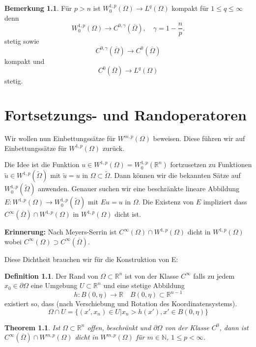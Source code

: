 \documentclass[
paper=a4,
bibtotocnumbered,
liststotocnumbered,
tablecaptionabove,
pointlessnumbers,
twoside,
openright,
10pt
]
{report}
\newtheorem{thm}{Theorem}[chapter]
\theoremstyle{definition}
\newtheorem*{df}{Definition}
\newtheorem*{rem}{Bemerkung}
\numberwithin{equation}{chapter}
\begin{document}
\begin{rem}
 Für $p>n$ ist $W_0^{1,p}(\Omega) \to L^q(\Omega)$ kompakt für $1\le q \le\infty$ denn 
 \begin{equation}
  W_0^{1,p}(\Omega) \to C^{0,\gamma}(\overline{\Omega}), \quad \gamma = 1-\frac{n}{p}.
 \end{equation}
 stetig sowie 
 \begin{equation}
  C^{0,\gamma}(\overline{\Omega}) \to C^0(\overline{\Omega})
 \end{equation}
kompakt und
 \begin{equation}
  C^0(\overline{\Omega}) \to L^q(\Omega)
 \end{equation}
 stetig.
 
 \chapter{Fortsetzungs- und Randoperatoren}

 Wir wollen nun Einbettungssätze für $W^{m,p}(\Omega)$ beweisen. Diese führen wir auf Einbettungssätze für $W^{1,p}(\Omega)$ zurück.  

 Die Idee ist die Funktion $u\in W^{1,p}(\Omega)=W_0^{1,p}(\mathbb R^n)$ fortzusetzen zu Funktionen $\tilde u \in W^{1,p}(\tilde \Omega)$ mit $\tilde u = u$ in $\Omega\subset \tilde \Omega$.   Dann können wir die bekannten Sätze auf $W_0^{1,p}(\tilde \Omega)$ anwenden.   Genauer suchen wir eine beschränkte lineare Abbildung $E: W^{1,p}(\Omega)\to W_0^{1,p}(\tilde \Omega)$ mit $Eu=u$ in $\Omega$.  Die Existenz von $E$ impliziert dass $C^\infty(\overline{\Omega}) \cap W^{1,p}(\Omega)$ in $W^{1,p}(\Omega)$ dicht ist.
 
 \textbf{Erinnerung:} Nach Meyers-Serrin ist $C^\infty(\Omega) \cap W^{1,p}(\Omega)$ dicht in $W^{1,p}(\Omega)$ wobei $C^\infty(\Omega) \supset C^\infty(\overline{\Omega})$.

Diese Dichtheit brauchen wir für die Konstruktion von E:
\end{rem}

\begin{df}
 Der Rand von $\Omega\subset \mathbb R^n$ ist von der Klasse $C^\infty$ falls zu jedem $x_0 \in \partial \Omega$ eine Umgebung $U\subset \mathbb R^n$ und eine stetige Abbildung
 \begin{equation}
  h: B(0, \eta) \to \mathbb R \quad B(0,\eta) \subset \mathbb R^{n-1}
 \end{equation}
existiert so, dass (nach Verschiebung und Rotation des Koordinatensystems).
\begin{equation}
 \Omega \cap U = \{ (x', x_n) \in U| x_n >h(x') , x'\in B(0, \eta)\}
\end{equation}
\end{df}
\begin{thm}\label{thm3.9}
 Ist $\Omega \subset \mathbb R^n$ offen, beschränkt und $\partial \Omega$ von der Klasse $C^0$, dann ist $C^\infty(\overline{\Omega}) \cap W^{m,p}(\Omega)$ dicht in $W^{m,p}(\Omega)$ für $m\in \mathbb N$, $1\le p <\infty$.
\end{thm}
\end{document}

